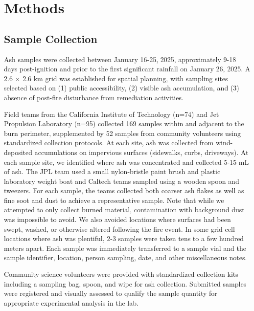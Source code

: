 \documentclass[12pt,letterpaper]{article}
\begin{document}
\section{Methods}

\subsection{Sample Collection}

Ash samples were collected between January 16-25, 2025, approximately 9-18 days post-ignition and prior to the first significant rainfall on January 26, 2025. A 2.6 $\times$ 2.6 km grid was established for spatial planning, with sampling sites selected based on (1) public accessibility, (2) visible ash accumulation, and (3) absence of post-fire disturbance from remediation activities.

Field teams from the California Institute of Technology (n=74) and Jet Propulsion Laboratory (n=95) collected 169 samples within and adjacent to the burn perimeter, supplemented by 52 samples from community volunteers using standardized collection protocols. At each site, ash was collected from wind-deposited accumulations on impervious surfaces (sidewalks, curbs, driveways). At each sample site, we identified where ash was concentrated and collected 5-15 mL of ash. The JPL team used a small nylon-bristle paint brush and plastic laboratory weight boat and Caltech teams sampled using a wooden spoon and tweezers. For each sample, the teams collected both coarser ash flakes as well as fine soot and dust to achieve a representative sample. Note that while we attempted to only collect burned material, contamination with background dust was impossible to avoid. We also avoided locations where surfaces had been swept, washed, or otherwise altered following the fire event. In some grid cell locations where ash was plentiful, 2-3 samples were taken tens to a few hundred meters apart. Each sample was immediately transferred to a sample vial and the sample identifier, location, person sampling, date, and other miscellaneous notes. 

Community science volunteers were provided with standardized collection kits including a sampling bag, spoon, and wipe for ash collection. Submitted samples were registered and visually assessed to qualify the sample quantity for appropriate experimental analysis in the lab.
\end{document}
